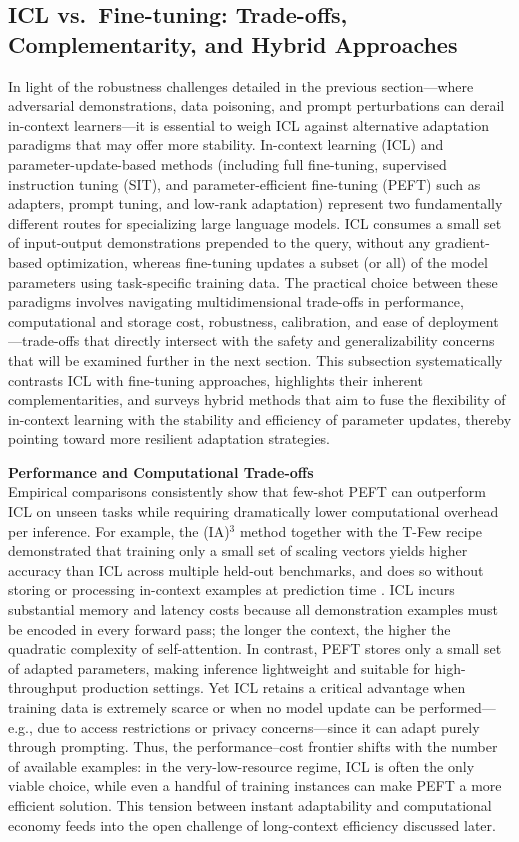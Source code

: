\documentclass[11pt]{article}
\begin{document}
\subsection{ICL vs.~Fine-tuning: Trade-offs, Complementarity, and Hybrid Approaches}

In light of the robustness challenges detailed in the previous section---where adversarial demonstrations, data poisoning, and prompt perturbations can derail in-context learners---it is essential to weigh ICL against alternative adaptation paradigms that may offer more stability. In-context learning (ICL) and parameter-update-based methods (including full fine-tuning, supervised instruction tuning (SIT), and parameter-efficient fine-tuning (PEFT) such as adapters, prompt tuning, and low-rank adaptation) represent two fundamentally different routes for specializing large language models. ICL consumes a small set of input-output demonstrations prepended to the query, without any gradient-based optimization, whereas fine-tuning updates a subset (or all) of the model parameters using task-specific training data. The practical choice between these paradigms involves navigating multidimensional trade-offs in performance, computational and storage cost, robustness, calibration, and ease of deployment---trade-offs that directly intersect with the safety and generalizability concerns that will be examined further in the next section. This subsection systematically contrasts ICL with fine-tuning approaches, highlights their inherent complementarities, and surveys hybrid methods that aim to fuse the flexibility of in-context learning with the stability and efficiency of parameter updates, thereby pointing toward more resilient adaptation strategies.

\textbf{Performance and Computational Trade-offs}\\
Empirical comparisons consistently show that few-shot PEFT can outperform ICL on unseen tasks while requiring dramatically lower computational overhead per inference. For example, the (IA)\(^3\) method together with the T-Few recipe demonstrated that training only a small set of scaling vectors yields higher accuracy than ICL across multiple held-out benchmarks, and does so without storing or processing in-context examples at prediction time \cite{ref179}. ICL incurs substantial memory and latency costs because all demonstration examples must be encoded in every forward pass; the longer the context, the higher the quadratic complexity of self-attention. In contrast, PEFT stores only a small set of adapted parameters, making inference lightweight and suitable for high-throughput production settings. Yet ICL retains a critical advantage when training data is extremely scarce or when no model update can be performed---e.g., due to access restrictions or privacy concerns---since it can adapt purely through prompting. Thus, the performance--cost frontier shifts with the number of available examples: in the very-low-resource regime, ICL is often the only viable choice, while even a handful of training instances can make PEFT a more efficient solution. This tension between instant adaptability and computational economy feeds into the open challenge of long-context efficiency discussed later.
\end{document}
